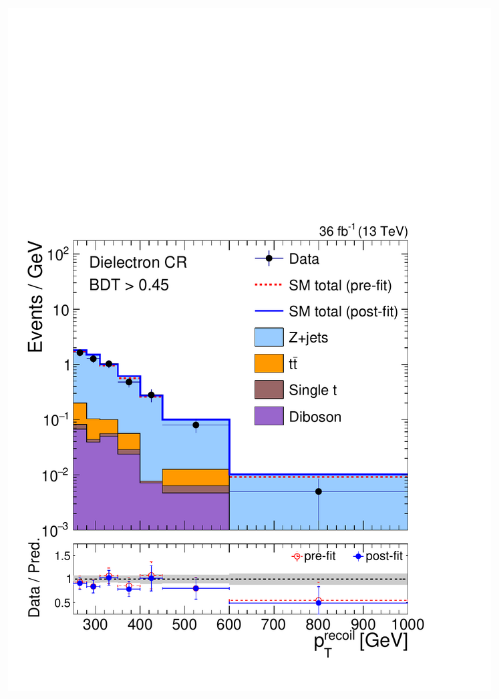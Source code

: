 \documentclass[aspectratio=169,xcolor=dvipsnames,,table,compress]{beamer}
\begin{document}
\begin{frame}[t]
\begin{columns}[T]
\begin{column}{0.125\textwidth}
      \includegraphics[width=\textwidth]{../figures/monotop/postfit/stackedPostfit_dielectron_monotop.pdf}
    \end{column}
    \begin{column}{0.125\textwidth}

\end{column}
\end{columns}
\end{frame}
\end{document}
